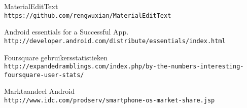 \begin{thebibliography}{9}
MaterialEditText
\\\texttt{https://github.com/rengwuxian/MaterialEditText}

Android essentials for a Successful App.
\\\texttt{http://developer.android.com/distribute/essentials/index.html}

Foursquare gebruikersstatistieken
\\\texttt{http://expandedramblings.com/index.php/by-the-numbers-interesting-foursquare-user-stats/}

Marktaandeel Android
\\\texttt{http://www.idc.com/prodserv/smartphone-os-market-share.jsp}


\end{thebibliography}





